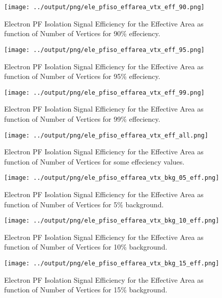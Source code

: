 \documentclass[11pt]{book}
\begin{document}
\begin{figure}[htb]
\centering
\texttt{[image: ../output/png/ele\_pfiso\_effarea\_vtx\_eff\_90.png]}
\caption{Electron PF Isolation Signal Efficiency for the Effective Area as function of Number of Vertices for 90\% effeciency.}
\label{fig:ele_pfiso_vtx_eff_effarea_eff_90}
\end{figure}

\begin{figure}[htb]
\centering
\texttt{[image: ../output/png/ele\_pfiso\_effarea\_vtx\_eff\_95.png]}
\caption{Electron PF Isolation Signal Efficiency for the Effective Area as function of Number of Vertices for 95\% effeciency.}
\label{fig:ele_pfiso_vtx_eff_effarea_eff_95}
\end{figure}

\begin{figure}[htb]
\centering
\texttt{[image: ../output/png/ele\_pfiso\_effarea\_vtx\_eff\_99.png]}
\caption{Electron PF Isolation Signal Efficiency for the Effective Area as function of Number of Vertices for 99\% effeciency.}
\label{fig:ele_pfiso_vtx_eff_effarea_eff_99}
\end{figure}

\begin{figure}[htb]
\centering
\texttt{[image: ../output/png/ele\_pfiso\_effarea\_vtx\_eff\_all.png]}
\caption{Electron PF Isolation Signal Efficiency for the Effective Area as function of Number of Vertices for some effeciency values.}
\label{fig:ele_pfiso_vtx_eff_effarea_eff_all}
\end{figure}

\begin{figure}[htb]
\centering
\texttt{[image: ../output/png/ele\_pfiso\_effarea\_vtx\_bkg\_05\_eff.png]}
\caption{Electron PF Isolation Signal Efficiency for the Effective Area as function of Number of Vertices for 5\% background.}
\label{fig:ele_pfiso_vtx_eff_effarea_bkg_05_eff}
\end{figure}

\begin{figure}[htb]
\centering
\texttt{[image: ../output/png/ele\_pfiso\_effarea\_vtx\_bkg\_10\_eff.png]}
\caption{Electron PF Isolation Signal Efficiency for the Effective Area as function of Number of Vertices for 10\% background.}
\label{fig:ele_pfiso_vtx_eff_effarea_bkg_10_eff}
\end{figure}

\begin{figure}[htb]
\centering
\texttt{[image: ../output/png/ele\_pfiso\_effarea\_vtx\_bkg\_15\_eff.png]}
\caption{Electron PF Isolation Signal Efficiency for the Effective Area as function of Number of Vertices for 15\% background.}
\label{fig:ele_pfiso_vtx_eff_effarea_bkg_15_eff}
\end{figure}
\end{document}
